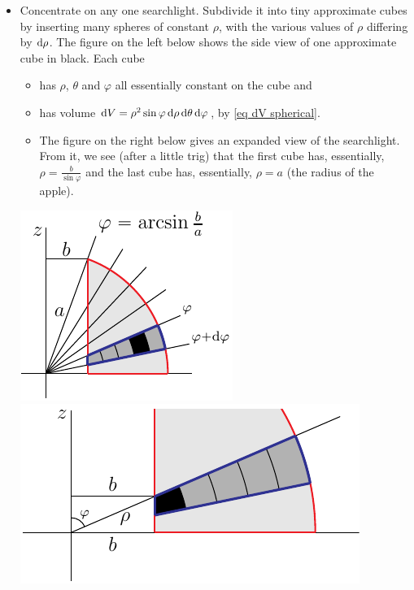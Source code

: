 \begin{eg}
\begin{itemize}
\item 
Concentrate on any one searchlight. Subdivide it into tiny approximate 
cubes by inserting many spheres of constant $\rho$, with the various values of $\rho$ differing by $\mathrm{d}\rho$. The figure on the left below shows the 
side view of one approximate cube in black. Each cube 
\vspace{-\topsep}
\begin{itemize} \itemsep1pt \parskip0pt 
\item
has $\rho$, $\theta$ and $\varphi$ all essentially constant on the cube and
\item
has volume $\mathrm{d}V=\rho^2\sin\varphi\,\mathrm{d}\rho\,\mathrm{d}\theta\,\mathrm{d}\varphi$,
by \eqref{eq dV spherical}.
\item 
The figure on the right below gives an expanded view of the searchlight.
From it, we see (after a little trig) that the first cube has, essentially, 
$\rho=\frac{b}{\sin\varphi}$ and the last cube has, essentially, $\rho=a$
(the radius of the apple).  
\end{itemize}
\vspace{-\topsep}
\begin{efig}
\begin{center}
    \includegraphics{appleCoreB3b.pdf}\qquad
    \includegraphics{appleCoreB3c.pdf}
\end{center}
\end{efig}
\end{itemize}


\end{eg}
